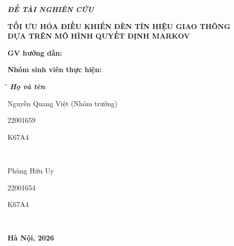 \documentclass[a4paper]{article}
\begin{document}
\begin{titlepage}
\begin{flushleft}
    \fontsize{14pt}{17pt}\selectfont
    \centering \textbf{\textsl{ĐỀ TÀI NGHIÊN CỨU}}
\end{flushleft}

\begin{center}
    \fontsize{18pt}{17pt}\selectfont
    \textbf{\textrm{TỐI ƯU HÓA ĐIỀU KHIỂN ĐÈN TÍN HIỆU GIAO THÔNG\\[6pt]
    DỰA TRÊN MÔ HÌNH QUYẾT ĐỊNH MARKOV}}
\end{center}

\vspace{15pt}
\textbf{GV hướng dẫn: }

\vspace{10pt}
\textbf{Nhóm sinh viên thực hiện:}

\begin{tabbing}
\hspace{8cm}\=\hspace{3cm}\=\hspace{3cm} \kill
{\it \textbf{Họ và tên}}\\
\begin{bfseries}Nguyễn Quang Việt (Nhóm trưởng)\end{bfseries}\> \begin{bfseries}22001659\end{bfseries}\> \begin{bfseries}K67A4\end{bfseries}\\
\begin{bfseries}Phùng Hữu Uy\end{bfseries}\> \begin{bfseries}22001654\end{bfseries}\> \begin{bfseries}K67A4\end{bfseries}\\
\end{tabbing}

\vspace{10pt}
\begin{center}
    \textbf{Hà Nội, 2026}
\end{center}
\end{titlepage}
\restoregeometry

\newpage

\vspace{1cm}

\begin{flushleft}

\end{flushleft}
\end{document}
